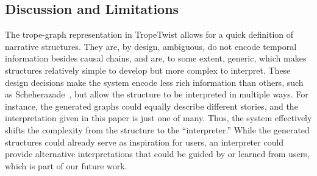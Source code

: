 \subsection{Discussion and Limitations}




The trope-graph representation in TropeTwist allows for a quick definition of narrative structures. They are, by design, ambiguous, do not encode temporal information besides causal chains, and are, to some extent, generic, which makes structures relatively simple to develop but more complex to interpret. These design decisions make the system encode less rich information than others, such as Scheherazade~\cite{p12elson-2012-dramabank}, but allow the structure to be interpreted in multiple ways. For instance, the generated graphs could equally describe different stories, and the interpretation given in this paper is just one of many. Thus, the system effectively shifts the complexity from the structure to the ``interpreter.'' While the generated structures could already serve as inspiration for users, an interpreter could provide alternative interpretations that could be guided by or learned from users, which is part of our future work.


